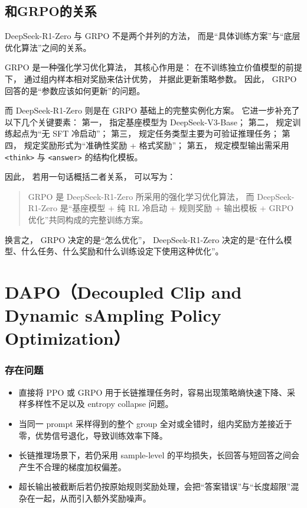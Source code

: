 \documentclass[UTF8]{ctexart}
\begin{document}
\subsection{和GRPO的关系}

DeepSeek-R1-Zero 与 GRPO 不是两个并列的方法，
而是“具体训练方案”与“底层优化算法”之间的关系。

GRPO 是一种强化学习优化算法，
其核心作用是：
在不训练独立价值模型的前提下，
通过组内样本相对奖励来估计优势，
并据此更新策略参数。
因此，
GRPO 回答的是“参数应该如何更新”的问题。

而 DeepSeek-R1-Zero 则是在 GRPO 基础上的完整实例化方案。
它进一步补充了以下几个关键要素：
第一，
指定基座模型为 DeepSeek-V3-Base；
第二，
规定训练起点为“无 SFT 冷启动”；
第三，
规定任务类型主要为可验证推理任务；
第四，
规定奖励形式为“准确性奖励 + 格式奖励”；
第五，
规定模型输出需采用 \texttt{<think>} 与 \texttt{<answer>} 的结构化模板。

因此，
若用一句话概括二者关系，
可以写为：
\begin{quote}
GRPO 是 DeepSeek-R1-Zero 所采用的强化学习优化算法，
而 DeepSeek-R1-Zero 是“基座模型 + 纯 RL 冷启动 + 规则奖励 + 输出模板 + GRPO 优化”共同构成的完整训练方案。
\end{quote}

换言之，
GRPO 决定的是“怎么优化”，
DeepSeek-R1-Zero 决定的是“在什么模型、什么任务、什么奖励和什么训练设定下使用这种优化”。



\section{DAPO（Decoupled Clip and Dynamic sAmpling Policy Optimization）}

\subsubsection{存在问题}

\begin{itemize}
    \item 直接将 PPO 或 GRPO 用于长链推理任务时，容易出现策略熵快速下降、采样多样性不足以及 entropy collapse 问题。
    \item 当同一 prompt 采样得到的整个 group 全对或全错时，组内奖励方差接近于零，优势信号退化，导致训练效率下降。
    \item 长链推理场景下，若仍采用 sample-level 的平均损失，长回答与短回答之间会产生不合理的梯度加权偏差。
    \item 超长输出被截断后若仍按原始规则奖励处理，会把“答案错误”与“长度超限”混杂在一起，从而引入额外奖励噪声。
\end{itemize}
\end{document}
